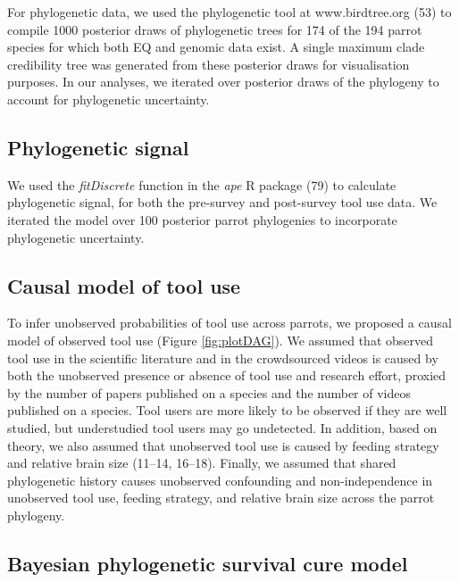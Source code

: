 \documentclass[
  man,floatsintext]{apa6}
\begin{document}
For phylogenetic data, we used the phylogenetic tool at www.birdtree.org
(53) to compile 1000 posterior draws of phylogenetic trees for 174 of the
194 parrot species for which both EQ and genomic data exist. A single maximum
clade credibility tree was generated from these posterior draws for
visualisation purposes. In our analyses, we iterated over posterior draws of the
phylogeny to account for phylogenetic uncertainty.

\hypertarget{phylogenetic-signal}{%
\subsection{Phylogenetic signal}\label{phylogenetic-signal}}

We used the \emph{fitDiscrete} function in the \emph{ape} R package (79) to
calculate phylogenetic signal, for both the pre-survey and post-survey tool use
data. We iterated the model over 100 posterior parrot phylogenies to incorporate
phylogenetic uncertainty.

\hypertarget{causal-model-of-tool-use}{%
\subsection{Causal model of tool use}\label{causal-model-of-tool-use}}

To infer unobserved probabilities of tool use across parrots, we proposed a
causal model of observed tool use (Figure \ref{fig:plotDAG}). We assumed that
observed tool use in the scientific literature and in the crowdsourced videos is
caused by both the unobserved presence or absence of tool use and research
effort, proxied by the number of papers published on a species and the number of
videos published on a species. Tool users are more likely to be observed if they
are well studied, but understudied tool users may go undetected. In addition,
based on theory, we also assumed that unobserved tool use is caused by feeding
strategy and relative brain size (11--14, 16--18). Finally, we
assumed that shared phylogenetic history causes unobserved confounding and
non-independence in unobserved tool use, feeding strategy, and relative brain
size across the parrot phylogeny.

\hypertarget{bayesian-phylogenetic-survival-cure-model}{%
\subsection{Bayesian phylogenetic survival cure model}\label{bayesian-phylogenetic-survival-cure-model}}
\end{document}
